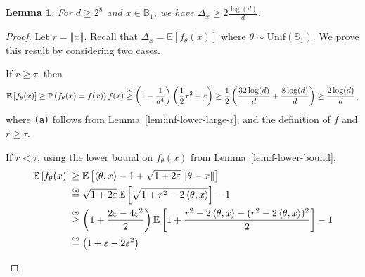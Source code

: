 \documentclass[letter, 12pt]{report}
\newcommand{\explan}[1]{\stackrel{\text{\tiny \texttt{#1}}}}
\newcommand{\ip}[1]{\left \langle #1 \right \rangle}
\newcommand{\sphere}{\mathbb{S}}
\newcommand{\paren}[1]{\left( #1 \right)}
\newcommand{\brak}[1]{\left[ #1 \right]}
\newcommand{\norm}[1]{\left \Vert  #1 \right \Vert}
\newcommand{\E}{\mathbb E}
\newcommand{\1}{\mathbf{1}}
\newcommand{\mP}{\mathbb{P}}
\renewcommand{\epsilon}{\varepsilon}
\theoremstyle{plain}
\newtheorem{lemma}[theorem]{Lemma}
\theoremstyle{definition}
\theoremstyle{remark}
\begin{document}
\begin{lemma}\label{lem:large-delta-anyr}
    For $d \geq 2^8$ and $x \in \mathbb{B}_1$, we have $\Delta_x \geq 2\frac{\log(d)}{d}$.
\end{lemma}
\begin{proof}
    Let $r = \norm{x}$.
    Recall that $\Delta_x = \E\brak{f_\theta(x)}$ where $\theta \sim \text{Unif}(\sphere_1)$.
    We prove this result by considering two cases.
    \begin{enumcases}
        \item If $r \geq \tau$,
        then
        \begin{align*}
            \E\brak{f_\theta(x)}
            \geq
            \mP\paren{f_\theta(x) = f(x)}f(x)
            \explan{(a)}
            \geq
            \paren{
                1- \frac{1}{d^4}
            }
            \paren{
                \frac12 \tau^2
                +
                \epsilon
            }
            \geq
            \frac12
            \paren{
                \frac{32\log(d)}{d}
                +
                \frac{8\log(d)}{d}
            }
            \geq
            \frac{2\log(d)}{d}
            \,,
        \end{align*}
        where \texttt{(a)} follows from Lemma~\ref{lem:inf-lower-large-r},
        and the definition of $f$ and $r \geq \tau$.
        \item If $r < \tau$,
        using the lower bound on $f_\theta(x)$ from Lemma~\ref{lem:f-lower-bound},
        \begin{align*}
            \E\brak{
                f_\theta(x)
            }
             & \geq
            \E\brak{
                \ip{\theta, x} - 1 + \sqrt{1 + 2\epsilon}\norm{\theta - x}
            }       \\
             &
            \explan{(a)}
            = \sqrt{1 + 2\epsilon}\, \E\brak{
                \sqrt{
                    1 + r^2 - 2\ip{\theta, x}
                }
            } - 1   \\
             &
            \explan{(b)}
            \geq
            \paren{
                1 + \frac{2\epsilon - 4\epsilon^2}{2}
            }
            \E\brak{
                1
                +
                \frac{
                    r^2 - 2\ip{\theta, x}
                    -
                    (r^2 - 2\ip{\theta, x})^2
                }{2}
            }
            - 1
            \\
             &
            \explan{(c)}
            =
            \paren{
                1 + \epsilon - 2\epsilon^2
}
\end{align*}
\end{enumcases}
\end{proof}
\end{document}
